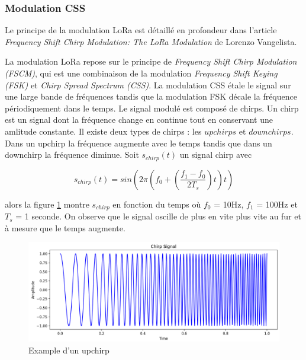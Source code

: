 \subsubsection{Modulation CSS}\label{css}

Le principe de la modulation LoRa est détaillé en profondeur dans l'article \textit{Frequency Shift Chirp Modulation: The LoRa Modulation} \cite{loraCSS} de Lorenzo Vangelista.

\vspace{0.1cm}

La modulation LoRa repose sur le principe de \textit{Frequency Shift Chirp Modulation (FSCM)}, qui est une combinaison de la modulation \textit{Frequency Shift Keying (FSK)} et \textit{Chirp Spread Spectrum (CSS)}.
La modulation CSS étale le signal sur une large bande de fréquences tandis que la modulation FSK décale la fréquence périodiquement dans le temps. Le signal modulé est composé de chirps. Un chirp est un signal dont la fréquence change en continue tout en conservant une amlitude constante. Il existe deux types de chirps : les $upchirps$ et $downchirps$.
Dans un upchirp la fréquence augmente avec le temps tandis que dans un downchirp la fréquence diminue. Soit $s_{chirp}(t)$ un signal chirp avec

\begin{equation}\label{eq3}
s_{chirp}(t) = sin(2\pi(f_0 + (\frac{f_1 - f_0}{2T_s})t)t)
\end{equation}

alors la figure \ref{term5} montre $s_{chirp}$ en fonction du temps où $f_0$ = 10Hz, $f_1$ = 100Hz et $T_s$ = 1 seconde. On observe que le signal oscille de plus en vite plus vite au fur et à mesure que le temps augmente.

\begin{figure}[h]
\centering

\includegraphics[scale=0.18]{images/CSSupchirp.png}
\caption{Example d'un upchirp}\label{term5}
\end{figure}

